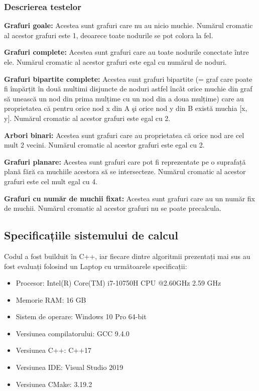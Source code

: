 \documentclass[runningheads]{llncs}
\begin{document}
\subsubsection{Descrierea testelor \\}

\textbf{Grafuri goale:} Acestea sunt grafuri care nu au nicio muchie. Numărul cromatic al acestor grafuri este 1, deoarece toate nodurile se pot colora la fel.

\textbf{Grafuri complete:} Acestea sunt grafuri care au toate nodurile conectate
între ele. Numărul cromatic al acestor grafuri este egal cu numărul de noduri.

\textbf{Grafuri bipartite complete:} Acestea sunt grafuri bipartite (=  graf care
poate fi împărțit în două multimi disjuncte
de noduri astfel încât orice muchie din graf să unească un nod din prima mulțime
cu un nod din a doua mulțime) care au proprietatea
că pentru orice nod x din A şi orice nod y din B există muchia [x, y].
Numărul cromatic al acestor grafuri este egal cu 2.

\textbf{Arbori binari:} Acestea sunt grafuri care au proprietatea că orice nod
are cel mult 2 vecini. Numărul cromatic al acestor grafuri este egal cu 2.

\textbf{Grafuri planare:} Acestea sunt grafuri care pot fi reprezentate pe o
suprafață plană fără ca muchiile acestora să se intersecteze. Numărul cromatic
al acestor grafuri este cel mult egal cu 4.

\textbf{Grafuri cu număr de muchii fixat:} Acestea sunt grafuri care au un număr
fix de muchii. Numărul cromatic al acestor grafuri nu se poate precalcula.


\subsection{Specificațiile sistemului de calcul}
Codul a fost builduit în C++, iar fiecare dintre algoritmii prezentați mai sus au fost
evaluați folosind un Laptop cu următoarele specificații:
\begin{itemize}
\item Procesor: Intel(R) Core(TM) i7-10750H CPU @2.60GHz   2.59 GHz
\item Memorie RAM: 16 GB
\item Sistem de operare: Windows 10 Pro 64-bit
\item Versiunea compilatorului: GCC 9.4.0
\item Versiunea C++: C++17
\item Versiunea IDE: Visual Studio 2019
\item Versiunea CMake: 3.19.2
\end{itemize}
\end{document}
